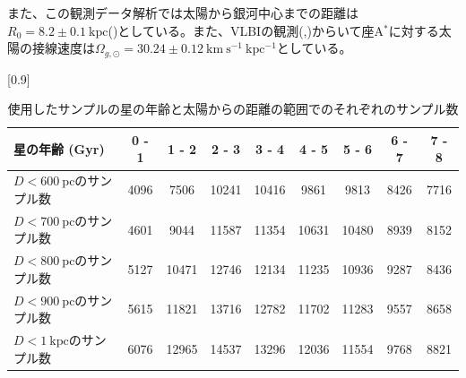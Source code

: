 また、この観測データ解析では太陽から銀河中心までの距離は$R_0 = 8.2\pm 0.1\ \mathrm{kpc}$(\cite{BH2016})としている。また、VLBIの観測(\cite{RB04},\cite{Reid08})からいて座A$^*$に対する太陽の接線速度は$\Omega_{g,\odot} = 30.24 \pm 0.12\ \mathrm{km\ s^{-1}\ kpc^{-1}}$としている。



\begin{table}[htb]
\small
\begin{center}
\scalebox{0.87}[0.9]{
\begin{tabular}{|l|cccccccc|} \hline
    星の年齢 (Gyr) & 0 - 1 & 1 - 2 & 2 - 3 & 3 - 4 & 4 - 5 & 5 - 6 & 6 - 7 & 7 - 8\\ \hline
    $D<600\ \mathrm{pc}$のサンプル数& 4096 & 7506 & 10241 & 10416 & 9861 & 9813 & 8426 & 7716\\
    $D<700\ \mathrm{pc}$のサンプル数 & 4601 & 9044 & 11587 & 11354 & 10631 & 10480 & 8939 & 8152\\
    $D<800\ \mathrm{pc}$のサンプル数 & 5127 & 10471 & 12746 & 12134 & 11235 & 10936 & 9287 & 8436\\
    $D<900\ \mathrm{pc}$のサンプル数 & 5615 & 11821 & 13716 & 12782 & 11702 & 11283 & 9557 & 8658\\
    $D<1\ \mathrm{kpc}$のサンプル数  & 6076 & 12965 & 14537 & 13296 & 12036 & 11554 & 9768 & 8821\\ \hline
\end{tabular}
}
\caption{使用したサンプルの星の年齢と太陽からの距離の範囲でのそれぞれのサンプル数}
\end{center} \label{dataset}
\end{table}


